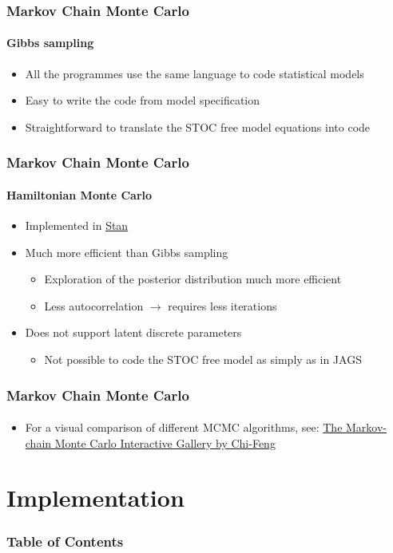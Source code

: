 \documentclass{beamer}
\begin{document}
\begin{frame}
\frametitle{Markov Chain Monte Carlo}
\framesubtitle{Gibbs sampling}
\begin{itemize}
 \item{All the programmes use the same language to code statistical models}
 \item{Easy to write the code from model specification}
 \item{Straightforward to translate the STOC free model equations into code}
\end{itemize}
\end{frame}

\begin{frame}
\frametitle{Markov Chain Monte Carlo}
\framesubtitle{Hamiltonian Monte Carlo}
\begin{itemize}
 \item{Implemented in \href{https://mc-stan.org}{Stan}}
 \item{Much more efficient than Gibbs sampling}
 \begin{itemize}
  \item{Exploration of the posterior distribution much more efficient}
  \item{Less autocorrelation $\rightarrow$ requires less iterations}
 \end{itemize}
 \item{Does not support latent discrete parameters}
 \begin{itemize}
  \item{Not possible to code the STOC free model as simply as in JAGS}
 \end{itemize}
\end{itemize}
\end{frame}

\begin{frame}
\frametitle{Markov Chain Monte Carlo}
\framesubtitle{}

\begin{itemize}
 \item{For a visual comparison of different MCMC algorithms, see: \href{http://chi-feng.github.io/mcmc-demo/}{The Markov-chain Monte Carlo Interactive Gallery by Chi-Feng}}
\end{itemize}
\end{frame}

\section{Implementation}
\begin{frame}
\frametitle{Table of Contents}
  \tableofcontents[currentsection]
\end{frame} 
\end{document}
